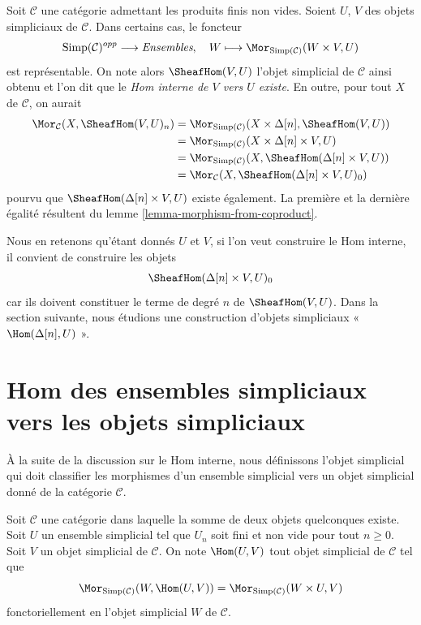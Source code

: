 \noindent
Soit $\mathcal{C}$ une catégorie admettant les produits finis non vides.
Soient $U$, $V$ des objets simpliciaux de $\mathcal{C}$. Dans certains
cas, le foncteur
$$
\text{Simp}(\mathcal{C})^{opp} \longrightarrow \textit{Ensembles}, \quad
W \longmapsto \Mor_{\text{Simp}(\mathcal{C})}(W \times V, U)
$$
est représentable. On note alors $\SheafHom(V, U)$ l'objet simplicial
de $\mathcal{C}$ ainsi obtenu et l'on dit que le
{\it Hom interne de $V$ vers $U$ existe}. En outre, pour tout $X$ de
$\mathcal{C}$, on aurait
\begin{align*}
\Mor_\mathcal{C}(X, \SheafHom(V, U)_n)
& =
\Mor_{\text{Simp}(\mathcal{C})}(X \times \Delta[n], \SheafHom(V, U)) \\
& =
\Mor_{\text{Simp}(\mathcal{C})}(X \times \Delta[n]\times V, U) \\
& =
\Mor_{\text{Simp}(\mathcal{C})}(X, \SheafHom(\Delta[n] \times V, U)) \\
& =
\Mor_\mathcal{C}(X, \SheafHom(\Delta[n] \times V, U)_0)
\end{align*}
pourvu que $\SheafHom(\Delta[n] \times V, U)$ existe également.
La première et la dernière égalité résultent du lemme
\ref{lemma-morphism-from-coproduct}.

\medskip\noindent
Nous en retenons qu'étant donnés $U$ et $V$, si l'on veut construire le
Hom interne, il convient de construire les objets
$$
\SheafHom(\Delta[n] \times V, U)_0
$$
car ils doivent constituer le terme de degré $n$ de $\SheafHom(V, U)$.
Dans la section suivante, nous étudions une construction d'objets
simpliciaux « $\Hom(\Delta[n], U)$ ».
\section{Hom des ensembles simpliciaux vers les objets simpliciaux}
\label{section-hom-from-simplicial-sets}

\noindent
À la suite de la discussion sur le Hom interne, nous définissons l'objet
simplicial qui doit classifier les morphismes d'un ensemble simplicial
vers un objet simplicial donné de la catégorie $\mathcal{C}$.

\begin{definition}
\label{definition-hom-from-simplicial-set}
Soit $\mathcal{C}$ une catégorie dans laquelle la somme de deux objets
quelconques existe. Soit $U$ un ensemble simplicial tel que $U_n$ soit
fini et non vide pour tout $n \geq 0$. Soit $V$ un objet simplicial de
$\mathcal{C}$. On note {\it $\Hom(U, V)$} tout objet simplicial de
$\mathcal{C}$ tel que
$$
\Mor_{\text{Simp}(\mathcal{C})}(W, \Hom(U, V))
=
\Mor_{\text{Simp}(\mathcal{C})}(W \times U, V)
$$
fonctoriellement en l'objet simplicial $W$ de $\mathcal{C}$.
\end{definition}

